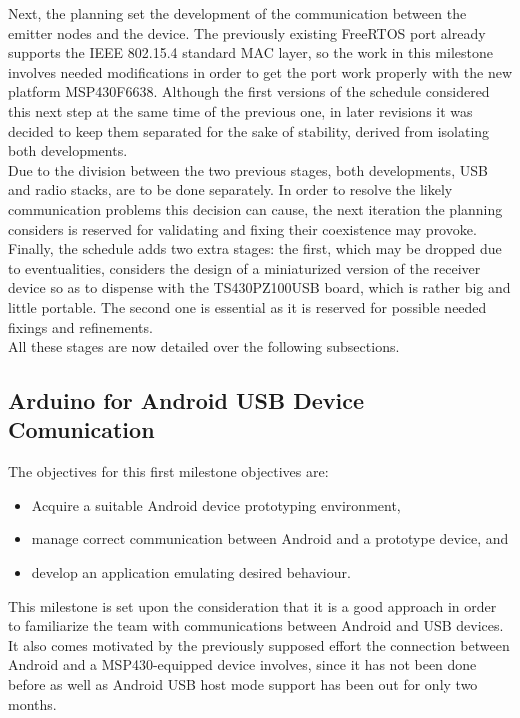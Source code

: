 	Next, the planning set the development of the communication between the emitter nodes and the device.
	The previously existing FreeRTOS port already supports the IEEE 802.15.4 standard MAC layer, so the
	work in this milestone involves needed modifications in order to get the port work properly with
	the new platform MSP430F6638. Although the first versions of the schedule considered this next step 
	at the same time of the previous one, in later revisions it was decided to keep them separated for 
	the sake of stability, derived from isolating both developments.\\
	
	Due to the division between the two previous stages, both developments, USB and radio stacks, are
	to be done separately. In order to resolve the likely communication problems this decision can cause,
	the next iteration the planning considers is reserved for validating and fixing their coexistence
	may provoke.\\
	
	Finally, the schedule adds two extra stages: the first, which may be dropped due to eventualities,
	considers the design of a miniaturized version of the receiver device so as to dispense with the
	TS430PZ100USB board, which is rather big and little portable. The second one is essential as it
	is reserved for possible needed fixings and refinements.\\
	
	All these stages are now detailed over the following subsections.\\

	\subsection{Arduino for Android USB Device Comunication}
	\label{ssec:Arduino.USB}
		The objectives for this first milestone objectives are:
		\begin{itemize}
			\item Acquire a suitable Android device prototyping environment, 
			\item manage correct communication between Android and a prototype device, and
			\item develop an application emulating desired behaviour.
		\end{itemize}
			
		This milestone is set upon the consideration that it is a good approach in order to familiarize
		the team with communications between Android and USB devices. It also comes motivated by the
		previously supposed effort the connection between Android and a MSP430-equipped device involves,
		since it has not been done before as well as Android USB host mode support has been out for only
		two months.\\

